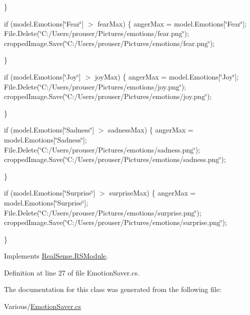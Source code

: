 \}

if (model.\+Emotions\mbox{[}\char`\"{}\+Fear\char`\"{}\mbox{]} $>$ fear\+Max) \{ anger\+Max = model.\+Emotions\mbox{[}\char`\"{}\+Fear\char`\"{}\mbox{]}; File.\+Delete(\char`\"{}\+C\+:/\+Users/prouser/\+Pictures/emotions/fear.\+png\char`\"{}); cropped\+Image.\+Save(\char`\"{}\+C\+:/\+Users/prouser/\+Pictures/emotions/fear.\+png\char`\"{});

\}

if (model.\+Emotions\mbox{[}\char`\"{}\+Joy\char`\"{}\mbox{]} $>$ joy\+Max) \{ anger\+Max = model.\+Emotions\mbox{[}\char`\"{}\+Joy\char`\"{}\mbox{]}; File.\+Delete(\char`\"{}\+C\+:/\+Users/prouser/\+Pictures/emotions/joy.\+png\char`\"{}); cropped\+Image.\+Save(\char`\"{}\+C\+:/\+Users/prouser/\+Pictures/emotions/joy.\+png\char`\"{});

\}

if (model.\+Emotions\mbox{[}\char`\"{}\+Sadness\char`\"{}\mbox{]} $>$ sadness\+Max) \{ anger\+Max = model.\+Emotions\mbox{[}\char`\"{}\+Sadness\char`\"{}\mbox{]}; File.\+Delete(\char`\"{}\+C\+:/\+Users/prouser/\+Pictures/emotions/sadness.\+png\char`\"{}); cropped\+Image.\+Save(\char`\"{}\+C\+:/\+Users/prouser/\+Pictures/emotions/sadness.\+png\char`\"{});

\}

if (model.\+Emotions\mbox{[}\char`\"{}\+Surprise\char`\"{}\mbox{]} $>$ surprise\+Max) \{ anger\+Max = model.\+Emotions\mbox{[}\char`\"{}\+Surprise\char`\"{}\mbox{]}; File.\+Delete(\char`\"{}\+C\+:/\+Users/prouser/\+Pictures/emotions/surprise.\+png\char`\"{}); cropped\+Image.\+Save(\char`\"{}\+C\+:/\+Users/prouser/\+Pictures/emotions/surprise.\+png\char`\"{});

\}

Implements \hyperlink{class_real_sense_1_1_r_s_module_a2ec830b7932ee7c0077d473f81c73867}{Real\+Sense.\+R\+S\+Module}.



Definition at line 27 of file Emotion\+Saver.\+cs.



The documentation for this class was generated from the following file\+:\begin{DoxyCompactItemize}
\item 
Various/\hyperlink{_emotion_saver_8cs}{Emotion\+Saver.\+cs}\end{DoxyCompactItemize}
